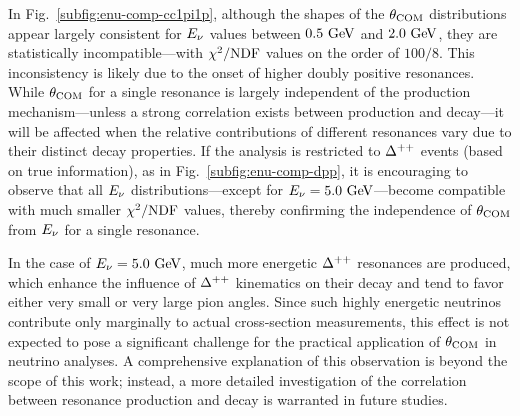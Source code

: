      In Fig.~\ref{subfig:enu-comp-cc1pi1p}, although the shapes of the $\theta_{\textrm{COM}}$ distributions appear largely consistent for $E_{\nu}$ values between $0.5~\textrm{GeV}$ and $2.0~\textrm{GeV}$, they are statistically incompatible—with $\chi^2/{\textrm{NDF}}$ values on the order of $100/8$. 
     This inconsistency is likely due to the onset of higher doubly positive resonances. 
     While $\theta_{\textrm{COM}}$ for a single resonance is largely independent of the production mechanism—unless a strong correlation exists between production and decay—it will be affected when the relative contributions of different resonances vary due to their distinct decay properties. 
     If the analysis is restricted to $\Delta^{++}$ events (based on true information), as in Fig.~\ref{subfig:enu-comp-dpp}, it is encouraging to observe that all $E_{\nu}$ distributions—except for $E_{\nu}=5.0~\textrm{GeV}$—become compatible with much smaller $\chi^2/{\textrm{NDF}}$ values, thereby confirming the independence of $\theta_{\textrm{COM}}$ from $E_{\nu}$ for a single resonance.

     In the case of $E_{\nu}=5.0~\textrm{GeV}$, much more energetic $\Delta^{++}$ resonances are produced, which enhance the influence of $\Delta^{++}$ kinematics on their decay and tend to favor either very small or very large pion angles.
     Since such highly energetic neutrinos contribute only marginally to actual cross‐section measurements, this effect is not expected to pose a significant challenge for the practical application of $\theta_{\textrm{COM}}$ in neutrino analyses.
     A comprehensive explanation of this observation is beyond the scope of this work; instead, a more detailed investigation of the correlation between resonance production and decay is warranted in future studies.

